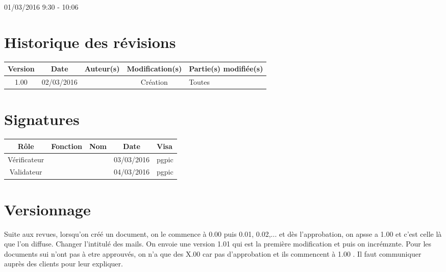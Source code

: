 \documentclass [a4paper] {article}
\begin{document}
\rhead{}

01/03/2016
\hfill   
\hfill 	9:30 - 10:06 				%



\section*{Historique des révisions}
\begin{center}
			\begin{tabular}{| c | c | c | c | p{4cm} |}
				\hline
				\rowcolor{Gray}
				Version & Date & Auteur(s) & Modification(s) & Partie(s) modifiée(s)		 \\
				\hline
				1.00 & 02/03/2016 & \Pierre & Création & Toutes \\
		\hline		
			\end{tabular}
		\end{center}

\section*{Signatures}

		\begin{center}
			\begin{tabular}{| c | c | c | c | p{4cm} |}
				\hline
				\rowcolor{Gray}
				Rôle & Fonction & Nom & Date & Visa		 \\
				\hline
				Vérificateur & \RQA & \Kafui & 03/03/2016 & pgpic \\[30pt]
				\hline
				Validateur & \CP & \Sergi & 04/03/2016 & pgpic \\[30pt]	
				\hline
			\end{tabular}
		\end{center}


\section{Versionnage}
Suite aux revues, lorsqu'on créé un document, on le commence à 0.00 puis 0.01, 0.02,... et dès l'approbation, on apsse a 1.00 et c'est celle là que l'on diffuse.
Changer l'intitulé des mails. On envoie une version 1.01 qui est la première modification et puis on incrémznte. Pour les documents sui n'ont pas à etre approuvés, on n'a que des X.00 car pas d'approbation et ils commencent à 1.00 . Il faut communiquer auprès des clients pour leur expliquer.
\end{document}
